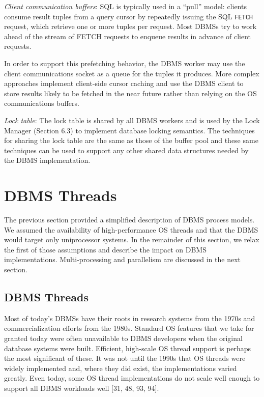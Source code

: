 \documentclass[b5paper,11pt,twoside,openright]{book}
\begin{document}
\emph{Client communication buffers}: SQL is typically used in a ``pull''
model: clients consume result tuples from a query cursor by repeatedly
issuing the SQL \texttt{FETCH} request, which retrieve one or more tuples per
request. Most DBMSs try to work ahead of the stream of FETCH requests to
enqueue results in advance of client requests.

In order to support this prefetching behavior, the DBMS worker may use
the client communications socket as a queue for the tuples it produces.
More complex approaches implement client-side cursor caching and use the
DBMS client to store results likely to be fetched in the near future
rather than relying on the OS communications buffers.

\emph{Lock table}: The lock table is shared by all DBMS workers and is
used by the Lock Manager (Section 6.3) to implement database locking
semantics. The techniques for sharing the lock table are the same as
those of the buffer pool and these same techniques can be used to
support any other shared data structures needed by the DBMS
implementation.

\hypertarget{dbms-threads}{%
\section{DBMS Threads}\label{dbms-threads}}

The previous section provided a simplified description of DBMS process
models. We assumed the availability of high-performance OS threads and
that the DBMS would target only uniprocessor systems. In the remainder
of this section, we relax the first of those assumptions and describe
the impact on DBMS implementations. Multi-processing and parallelism are
discussed in the next section.

\hypertarget{dbms-threads-1}{%
\subsection{DBMS Threads}\label{dbms-threads-1}}

Most of today's DBMSs have their roots in research systems from the
1970s and commercialization efforts from the 1980s. Standard OS features
that we take for granted today were often unavailable to DBMS developers
when the original database systems were built. Efficient, high-scale OS
thread support is perhaps the most significant of these. It was not
until the 1990s that OS threads were widely implemented and, where they
did exist, the implementations varied greatly. Even today, some OS
thread implementations do not scale well enough to support all DBMS
workloads well {[}31, 48, 93, 94{]}.
\end{document}
